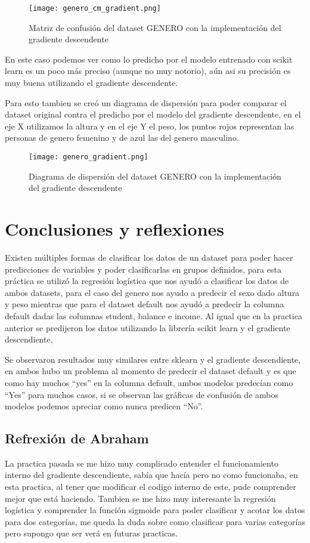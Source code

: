 \documentclass[sigconf,authorversion,nonacm]{acmart}
\begin{document}
\begin{figure}[H]
  \centering
  \texttt{[image: genero\_cm\_gradient.png]}
  \caption{Matriz de confusión del dataset GENERO con la implementación del gradiente descendente}
\end{figure}

En este caso podemos ver como lo predicho por el modelo entrenado con scikit learn es un poco más preciso (aunque no muy notorio), aún asi su precisión es muy buena utilizando el gradiente descendente.

Para esto tambien se creó un diagrama de dispersión para poder comparar el dataset original contra el predicho por el modelo del gradiente descendente, en el eje X utilizamos la altura y en el eje Y el peso, los puntos rojos representan las personas de genero femenino y de azul las del genero masculino.

\begin{figure}[H]
  \centering
  \texttt{[image: genero\_gradient.png]}
  \caption{Diagrama de dispersión del dataset GENERO con la implementación del gradiente descendente}
\end{figure}


\section{Conclusiones y reflexiones}
Existen múltiples formas de clasificar los datos de un dataset para poder hacer predicciones de variables y poder clasificarlas en grupos definidos, para esta práctica se utilizó la regresión logística que nos ayudó a clasificar los datos de ambos datasets, para el caso del genero nos ayudo a predecir el sexo dado altura y peso mientras que para el dataset default nos ayudó a predecir la columna default dadas las columnas student, balance e income. Al igual que en la practica anterior se predijeron los datos utilizando la librería scikit learn y el gradiente descendiente,

Se observaron resultados muy similares entre sklearn y el gradiente descendiente, en ambos hubo un problema al momento de predecir el dataset default y es que como hay muchos “yes” en la columna default, ambos modelos predecían como “Yes” para muchos casos, si se observan las gráficas de confusión de ambos modelos podemos apreciar como nunca predicen “No”.

\subsection{Refrexión de Abraham}
La practica pasada se me hizo muy complicado entender el funcionamiento interno del gradiente descendiente, sabía que hacía pero no como funcionaba, en esta practica, al tener que modificar el codigo interno de este, pude comprender mejor que está haciendo. Tambien se me hizo muy interesante la regresión logística y comprender la función sigmoide para poder clasificar y acotar los datos para dos categorías, me queda la duda sobre como clasificar para varias categorías pero supongo que ser verá en futuras practicas.
\end{document}
